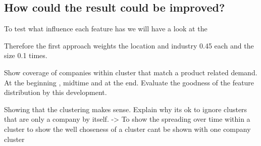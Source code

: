 \subsection{How could the result could be improved?}











To test what influence each feature has
we will have a look at the

 Therefore the first approach weights the location and industry 0.45 each and the size 0.1 times.

Show coverage of companies within cluster that match a product related demand. At the beginning , midtime and at the end.
Evaluate the goodness of the feature distribution by this development.

Showing that the clustering makes sense. Explain why its ok to ignore clusters that are only a company by itself. ->
To show the spreading over time within a cluster to show the well choseness of a cluster cant be shown with one company
cluster
